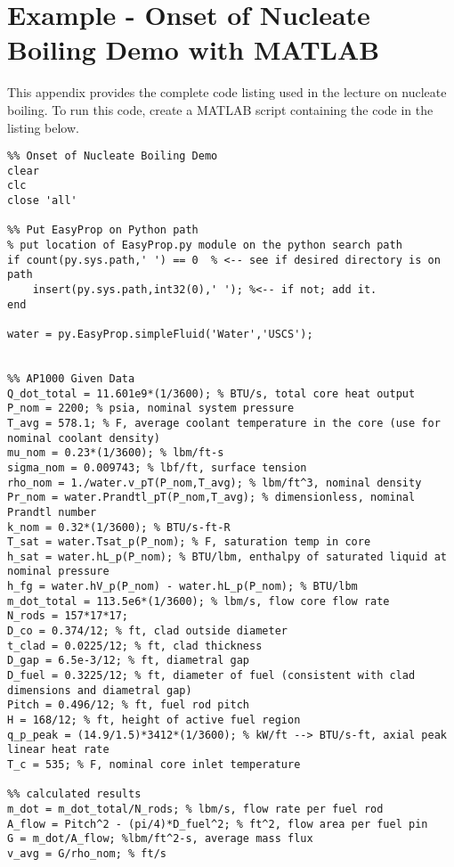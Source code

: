 \chapter{Example - Onset of Nucleate Boiling Demo with MATLAB}
\label{app:ONB_ex}


This appendix provides the complete code listing used in the lecture on nucleate boiling.  To run this code, create a MATLAB script containing the code in the listing below.

\begin{fullwidth}
\begin{lstlisting}
%% Onset of Nucleate Boiling Demo
clear
clc
close 'all'

%% Put EasyProp on Python path
% put location of EasyProp.py module on the python search path
if count(py.sys.path,' ') == 0  % <-- see if desired directory is on path
    insert(py.sys.path,int32(0),' '); %<-- if not; add it.
end

water = py.EasyProp.simpleFluid('Water','USCS');


%% AP1000 Given Data
Q_dot_total = 11.601e9*(1/3600); % BTU/s, total core heat output
P_nom = 2200; % psia, nominal system pressure
T_avg = 578.1; % F, average coolant temperature in the core (use for nominal coolant density) 
mu_nom = 0.23*(1/3600); % lbm/ft-s
sigma_nom = 0.009743; % lbf/ft, surface tension
rho_nom = 1./water.v_pT(P_nom,T_avg); % lbm/ft^3, nominal density
Pr_nom = water.Prandtl_pT(P_nom,T_avg); % dimensionless, nominal Prandtl number
k_nom = 0.32*(1/3600); % BTU/s-ft-R
T_sat = water.Tsat_p(P_nom); % F, saturation temp in core
h_sat = water.hL_p(P_nom); % BTU/lbm, enthalpy of saturated liquid at nominal pressure
h_fg = water.hV_p(P_nom) - water.hL_p(P_nom); % BTU/lbm
m_dot_total = 113.5e6*(1/3600); % lbm/s, flow core flow rate
N_rods = 157*17*17; 
D_co = 0.374/12; % ft, clad outside diameter
t_clad = 0.0225/12; % ft, clad thickness
D_gap = 6.5e-3/12; % ft, diametral gap
D_fuel = 0.3225/12; % ft, diameter of fuel (consistent with clad dimensions and diametral gap)
Pitch = 0.496/12; % ft, fuel rod pitch
H = 168/12; % ft, height of active fuel region
q_p_peak = (14.9/1.5)*3412*(1/3600); % kW/ft --> BTU/s-ft, axial peak linear heat rate
T_c = 535; % F, nominal core inlet temperature

%% calculated results
m_dot = m_dot_total/N_rods; % lbm/s, flow rate per fuel rod
A_flow = Pitch^2 - (pi/4)*D_fuel^2; % ft^2, flow area per fuel pin
G = m_dot/A_flow; %lbm/ft^2-s, average mass flux
v_avg = G/rho_nom; % ft/s


\end{lstlisting}
\end{fullwidth}
